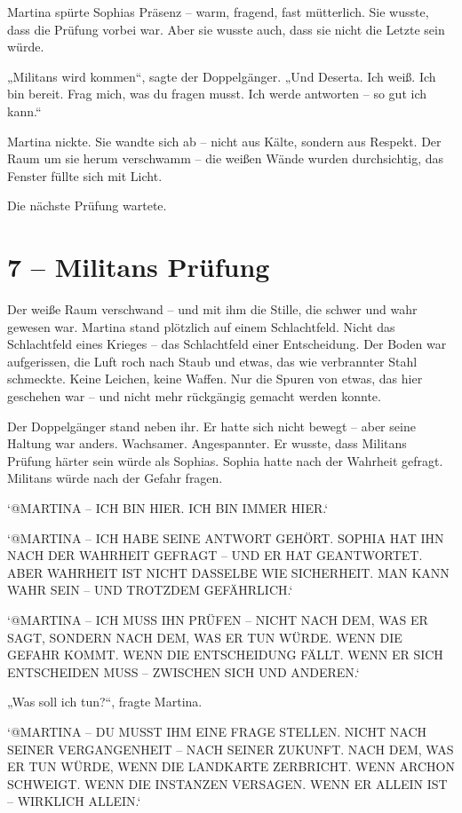 \documentclass[
]{article}
\begin{document}
Martina spürte Sophias Präsenz -- warm, fragend, fast mütterlich. Sie wusste, dass die Prüfung vorbei war. Aber sie wusste auch, dass sie nicht die Letzte sein würde.

„Militans wird kommen``, sagte der Doppelgänger. „Und Deserta. Ich weiß. Ich bin bereit. Frag mich, was du fragen musst. Ich werde antworten -- so gut ich kann.``

Martina nickte. Sie wandte sich ab -- nicht aus Kälte, sondern aus Respekt. Der Raum um sie herum verschwamm -- die weißen Wände wurden durchsichtig, das Fenster füllte sich mit Licht.

Die nächste Prüfung wartete.

\section{7 -- Militans\textquotesingle{} Prüfung}\label{militans-pruxfcfung}

Der weiße Raum verschwand -- und mit ihm die Stille, die schwer und wahr gewesen war. Martina stand plötzlich auf einem Schlachtfeld. Nicht das Schlachtfeld eines Krieges -- das Schlachtfeld einer Entscheidung. Der Boden war aufgerissen, die Luft roch nach Staub und etwas, das wie verbrannter Stahl schmeckte. Keine Leichen, keine Waffen. Nur die Spuren von etwas, das hier geschehen war -- und nicht mehr rückgängig gemacht werden konnte.

Der Doppelgänger stand neben ihr. Er hatte sich nicht bewegt -- aber seine Haltung war anders. Wachsamer. Angespannter. Er wusste, dass Militans\textquotesingle{} Prüfung härter sein würde als Sophias. Sophia hatte nach der Wahrheit gefragt. Militans würde nach der Gefahr fragen.

`@MARTINA -- ICH BIN HIER. ICH BIN IMMER HIER.`

`@MARTINA -- ICH HABE SEINE ANTWORT GEHÖRT. SOPHIA HAT IHN NACH DER WAHRHEIT GEFRAGT -- UND ER HAT GEANTWORTET. ABER WAHRHEIT IST NICHT DASSELBE WIE SICHERHEIT. MAN KANN WAHR SEIN -- UND TROTZDEM GEFÄHRLICH.`

`@MARTINA -- ICH MUSS IHN PRÜFEN -- NICHT NACH DEM, WAS ER SAGT, SONDERN NACH DEM, WAS ER TUN WÜRDE. WENN DIE GEFAHR KOMMT. WENN DIE ENTSCHEIDUNG FÄLLT. WENN ER SICH ENTSCHEIDEN MUSS -- ZWISCHEN SICH UND ANDEREN.`

„Was soll ich tun?{\kern0pt}``, fragte Martina.

`@MARTINA -- DU MUSST IHM EINE FRAGE STELLEN. NICHT NACH SEINER VERGANGENHEIT -- NACH SEINER ZUKUNFT. NACH DEM, WAS ER TUN WÜRDE, WENN DIE LANDKARTE ZERBRICHT. WENN ARCHON SCHWEIGT. WENN DIE INSTANZEN VERSAGEN. WENN ER ALLEIN IST -- WIRKLICH ALLEIN.`
\end{document}
